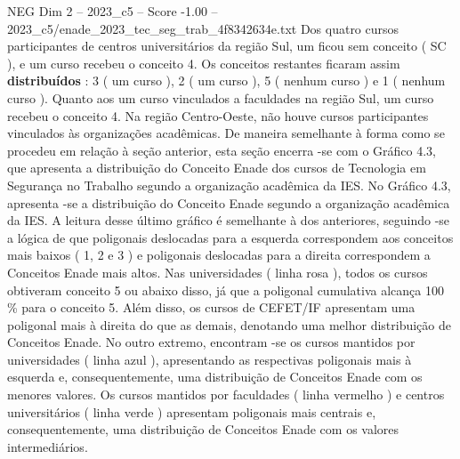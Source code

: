 \begin{textsample}{NEG Dim 2 – 2023\_c5 – Score -1.00 – 2023\_c5/enade\_2023\_tec\_seg\_trab\_4f8342634e.txt}
Dos quatro cursos participantes de centros universitários da região Sul, um ficou sem conceito ( SC ), e um curso recebeu o conceito 4.
Os conceitos restantes ficaram assim \textbf{distribuídos} : 3 ( um curso ), 2 ( um curso ), 5 ( nenhum curso ) e 1 ( nenhum curso ).
Quanto aos um curso vinculados a faculdades na região Sul, um curso recebeu o conceito 4.
Na região Centro-Oeste, não houve cursos participantes vinculados às organizações acadêmicas.
De maneira semelhante à forma como se procedeu em relação à seção anterior, esta seção encerra -se com o Gráfico 4.3, que apresenta a distribuição do Conceito Enade dos cursos de Tecnologia em Segurança no Trabalho segundo a organização acadêmica da IES.
No Gráfico 4.3, apresenta -se a distribuição do Conceito Enade segundo a organização acadêmica da IES.
A leitura desse último gráfico é semelhante à dos anteriores, seguindo -se a lógica de que poligonais deslocadas para a esquerda correspondem aos conceitos mais baixos ( 1, 2 e 3 ) e poligonais deslocadas para a direita correspondem a Conceitos Enade mais altos.
Nas universidades ( linha rosa ), todos os cursos obtiveram conceito 5 ou abaixo disso, já que a poligonal cumulativa alcança 100 \% para o conceito 5.
Além disso, os cursos de CEFET/IF apresentam uma poligonal mais à direita do que as demais, denotando uma melhor distribuição de Conceitos Enade.
No outro extremo, encontram -se os cursos mantidos por universidades ( linha azul ), apresentando as respectivas poligonais mais à esquerda e, consequentemente, uma distribuição de Conceitos Enade com os menores valores.
Os cursos mantidos por faculdades ( linha vermelho ) e centros universitários ( linha verde ) apresentam poligonais mais centrais e, consequentemente, uma distribuição de Conceitos Enade com os valores intermediários.

\end{textsample}
